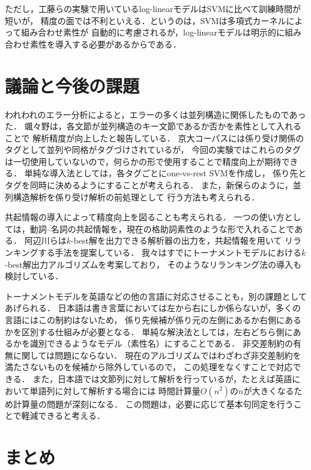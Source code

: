 \documentclass[japanese]{jnlp_1.4}
\begin{document}
ただし，工藤らの実験で用いているlog-linearモデルはSVMに比べて訓練時間が短いが，
精度の面では不利といえる．というのは，SVMは多項式カーネルによって組み合わせ素性が
自動的に考慮されるが，log-linearモデルは明示的に組み合わせ素性を導入する必要があるからである．
 



\section{議論と今後の課題}

われわれのエラー分析によると，エラーの多くは並列構造に関係したものであった．
颯々野は，各文節が並列構造のキー文節であるか否かを素性として入れることで
解析精度が向上したと報告している．
京大コーパスには係り受け関係のタグとして並列や同格がタグづけされているが，
今回の実験ではこれらのタグは一切使用していないので，何らかの形で使用することで精度向上が期待できる．
単純な導入法としては，各タグごとにone-vs-rest SVMを作成し，
係り先とタグを同時に決めるようにすることが考えられる．
また，新保らのように，並列構造解析を係り受け解析の前処理として
行う方法も考えられる．
 

共起情報の導入によって精度向上を図ることも考えられる．
一つの使い方としては，動詞--名詞の共起情報を，現在の格助詞素性のような形で入れることである．
阿辺川らは$k$-best解を出力できる解析器の出力を，共起情報を用いて
リランキングする手法を提案している．
我々はすでにトーナメントモデルにおける$k$-best解出力アルゴリズムを考案しており，
そのようなリランキング法の導入も検討している．


トーナメントモデルを英語などの他の言語に対応させることも，別の課題としてあげられる．
日本語は書き言葉においては左から右にしか係らないが，多くの言語にはこの制約はないため，
係り先候補が係り元の左側にあるか右側にあるかを区別する仕組みが必要となる．
単純な解決法としては，左右どちら側にあるかを識別できるようなモデル（素性名）にすることである．
非交差制約の有無に関しては問題にならない．
現在のアルゴリズムではわざわざ非交差制約を満たさないものを候補から除外しているので，
この処理をなくすことで対応できる．
また，日本語では文節列に対して解析を行っているが，たとえば英語において単語列に対して解析する場合には
時間計算量$O(n^2)$の$n$が大きくなるため計算量の問題が深刻になる．
この問題は，必要に応じて基本句同定を行うことで軽減できると考える．



\section{まとめ}
\end{document}
